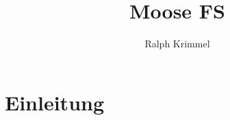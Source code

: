 \documentclass{beamer}
\title{Moose FS}
\author{Ralph Krimmel}
\begin{document}
\section{Einleitung}
\subsection*{}
\begin{frame}
	\maketitle
\end{frame}





\end{document}
